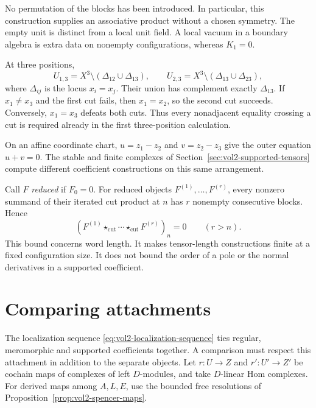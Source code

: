 No permutation of the blocks has been introduced. In particular,
this construction supplies an associative product without a chosen
symmetry. The empty unit is distinct from a local unit field.
A local vacuum in a boundary algebra is extra data on nonempty
configurations, whereas $K_1=0$.

\begin{example}\label{ex:vol2-outer-cut}
At three positions,
\[
 U_{1,3}=X^3\setminus(\Delta_{12}\cup\Delta_{13}),\qquad
 U_{2,3}=X^3\setminus(\Delta_{13}\cup\Delta_{23}),
\]
where $\Delta_{ij}$ is the locus $x_i=x_j$. Their union has
complement exactly $\Delta_{13}$. If $x_1\ne x_3$ and the first
cut fails, then $x_1=x_2$, so the second cut succeeds.
Conversely, $x_1=x_3$ defeats both cuts. Thus every nonadjacent
equality crossing a cut is required already in the first
three-position calculation.

On an affine coordinate chart,
$u=z_1-z_2$ and $v=z_2-z_3$ give the outer equation $u+v=0$.
The stable and finite complexes of
Section~\ref{sec:vol2-supported-tensors} compute different
coefficient constructions on this same arrangement.
\end{example}

Call $F$ \emph{reduced} if $F_0=0$.
For reduced objects $F^{(1)},\ldots,F^{(r)}$, every nonzero
summand of their iterated cut product at $n$ has $r$ nonempty
consecutive blocks. Hence
\begin{equation}\label{eq:vol2-positive-word-length}
 (F^{(1)}\star_{\mathrm{cut}}\cdots
          \star_{\mathrm{cut}}F^{(r)})_n=0\qquad(r>n).
\end{equation}
This bound concerns word length. It makes tensor-length constructions
finite at a fixed configuration size. It does not bound the order
of a pole or the normal derivatives in a supported coefficient.

\section{Comparing attachments}
\label{sec:vol2-coefficient-attachments}

The localization sequence \eqref{eq:vol2-localization-sequence}
ties regular, meromorphic and supported coefficients together.
A comparison must respect this attachment in addition to the
separate objects. Let $r:U\to Z$ and $r':U'\to Z'$ be cochain
maps of complexes of left $D$-modules, and take $D$-linear Hom
complexes. For derived maps among $A,L,E$, use the bounded free
resolutions of Proposition~\ref{prop:vol2-spencer-maps}.

